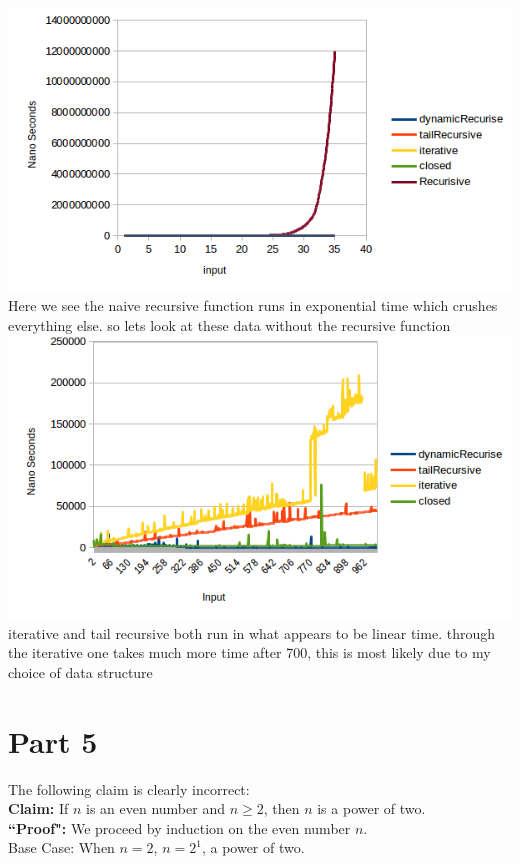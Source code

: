 \documentclass{article}
\begin{document}
\includegraphics{Exponential.png}
Here we see the naive recursive function runs in exponential time which crushes everything else. so lets look at these data without the recursive function\\

\includegraphics{FastTest.png}
iterative and tail recursive both run in what appears to be linear time. through the iterative one takes much more time after 700, this is most likely due to my choice of data structure


\newpage
\section{Part 5}
The following claim is clearly incorrect:\\

{\bf Claim:} If $n$ is an even number and $n\ge 2$, then $n$ is a power of two.\\

{\bf ``Proof":} We proceed by induction on the even number $n$. \\

Base Case: When $n=2$, $n=2^1$, a power of two.\\
\end{document}
